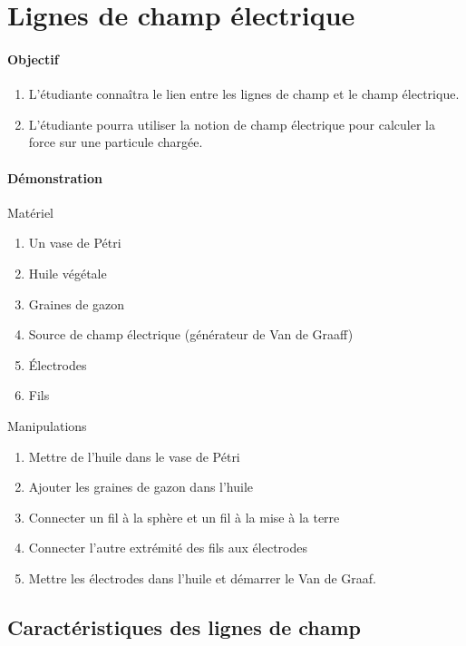 \section{Lignes de champ électrique}

\paragraph{Objectif}

\begin{enumerate}
  \item L'étudiante connaîtra le lien entre les lignes de champ et le champ
    électrique.
  \item L'étudiante pourra utiliser la notion de champ électrique pour calculer
    la force sur une particule chargée.
\end{enumerate}

\paragraph{Démonstration}

  Matériel
  \begin{enumerate}
    \item Un vase de Pétri
    \item Huile végétale
    \item Graines de gazon
    \item Source de champ électrique (générateur de Van de Graaff)
    \item Électrodes
    \item Fils
  \end{enumerate}

  Manipulations
  \begin{enumerate}
    \item Mettre de l'huile dans le vase de Pétri
    \item Ajouter les graines de gazon dans l'huile
    \item Connecter un fil à la sphère et un fil à la mise à la terre
    \item Connecter l'autre extrémité des fils aux électrodes
    \item Mettre les électrodes dans l'huile et démarrer le Van de Graaf.
  \end{enumerate}


\subsection*{Caractéristiques des lignes de champ}

